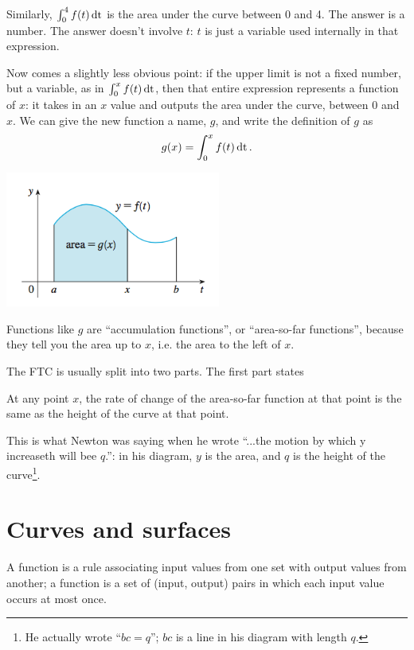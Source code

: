 \documentclass[12pt]{article}
\begin{document}
Similarly, $\int_0^4 f(t) \operatorname{\text{dt}}$ is the area under the curve between 0 and 4. The
answer is a number. The answer doesn't involve $t$: $t$ is just a variable used
internally in that expression.

Now comes a slightly less obvious point: if the upper limit is not a fixed
number, but a variable, as in $\int_0^{x} f(t) \operatorname{\text{dt}}$, then that entire
expression represents a function of $x$: it takes in an $x$ value and outputs
the area under the curve, between 0 and $x$. We can give the new function a
name, $g$, and write the definition of $g$ as
\begin{align*}
  g(x) = \int_0^{x} f(t) \operatorname{\text{dt}}.
\end{align*}

\includegraphics[width=200pt]{img/stewart-ftc-1.png}

Functions like $g$ are ``accumulation functions'', or ``area-so-far
functions'', because they tell you the area up to $x$, i.e. the area to the
left of $x$.

The FTC is usually split into two parts. The first part states\\
\begin{mdframed}
  At any point $x$, the rate of change of the area-so-far function at that
  point is the same as the height of the curve at that point.
\end{mdframed}

This is what Newton was saying when he wrote ``...the motion by which y
increaseth will bee $q$.'': in his diagram, $y$ is the area, and $q$ is the
height of the curve\footnote{He actually wrote ``$bc=q$''; $bc$ is a line in
  his diagram with length $q$.}.

\newpage
\section{Curves and surfaces}

A function is a rule associating input values from one set with output values
from another; a function is a set of (input, output) pairs in which each input
value occurs at most once.
\end{document}
